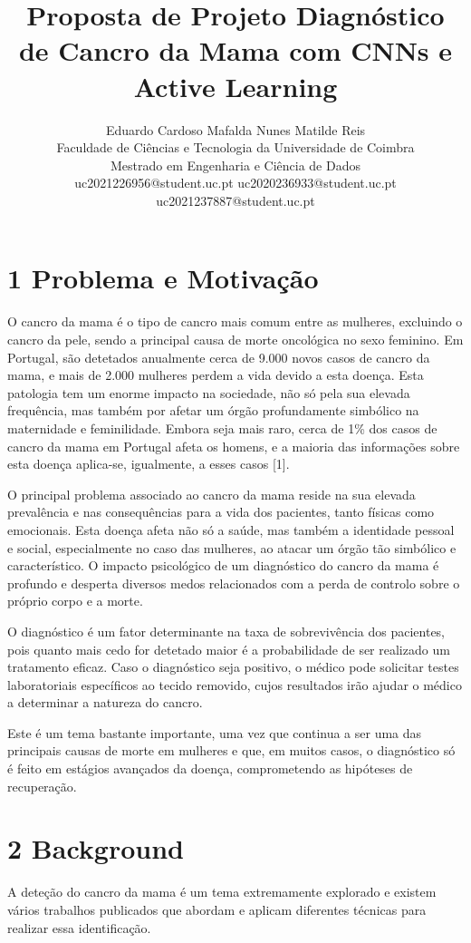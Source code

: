 \documentclass[10pt]{article}
\title{Proposta de Projeto Diagnóstico de Cancro da Mama com CNNs e Active Learning }
\author{Eduardo Cardoso Mafalda Nunes Matilde Reis\\
Faculdade de Ciências e Tecnologia da Universidade de Coimbra\\
Mestrado em Engenharia e Ciência de Dados\\
uc2021226956@student.uc.pt uc2020236933@student.uc.pt uc2021237887@student.uc.pt}
\date{}
\begin{document}
\maketitle


\section*{1 Problema e Motivação}
O cancro da mama é o tipo de cancro mais comum entre as mulheres, excluindo o cancro da pele, sendo a principal causa de morte oncológica no sexo feminino. Em Portugal, são detetados anualmente cerca de 9.000 novos casos de cancro da mama, e mais de 2.000 mulheres perdem a vida devido a esta doença. Esta patologia tem um enorme impacto na sociedade, não só pela sua elevada frequência, mas também por afetar um órgão profundamente simbólico na maternidade e feminilidade. Embora seja mais raro, cerca de 1\% dos casos de cancro da mama em Portugal afeta os homens, e a maioria das informações sobre esta doença aplica-se, igualmente, a esses casos [1].

O principal problema associado ao cancro da mama reside na sua elevada prevalência e nas consequências para a vida dos pacientes, tanto físicas como emocionais. Esta doença afeta não só a saúde, mas também a identidade pessoal e social, especialmente no caso das mulheres, ao atacar um órgão tão simbólico e característico. O impacto psicológico de um diagnóstico do cancro da mama é profundo e desperta diversos medos relacionados com a perda de controlo sobre o próprio corpo e a morte.

O diagnóstico é um fator determinante na taxa de sobrevivência dos pacientes, pois quanto mais cedo for detetado maior é a probabilidade de ser realizado um tratamento eficaz. Caso o diagnóstico seja positivo, o médico pode solicitar testes laboratoriais específicos ao tecido removido, cujos resultados irão ajudar o médico a determinar a natureza do cancro.

Este é um tema bastante importante, uma vez que continua a ser uma das principais causas de morte em mulheres e que, em muitos casos, o diagnóstico só é feito em estágios avançados da doença, comprometendo as hipóteses de recuperação.

\section*{2 Background}
A deteção do cancro da mama é um tema extremamente explorado e existem vários trabalhos publicados que abordam e aplicam diferentes técnicas para realizar essa identificação.
\end{document}
